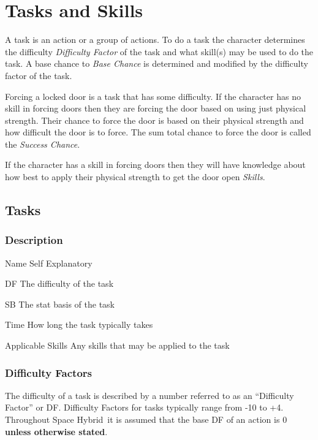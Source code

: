 \chapter{Tasks and Skills}

A task is an action or a group of actions. To do a task the 
character determines the difficulty {\em Difficulty Factor} of the 
task and what skill(s) may be used to do the task. A base chance to 
{\em Base Chance} is determined and modified by the difficulty factor 
of the task. 

Forcing a locked door is a task that has some difficulty. If the 
character has no skill in forcing doors then they are forcing the 
door based on using just physical strength. Their chance to force the 
door is based on their physical strength and how difficult the door 
is to force. The sum total chance to force the door is called the 
{\em Success Chance}.

If the character has a skill in forcing doors then they will have 
knowledge about how best to apply their physical strength to get the 
door open {\em Skills}. 

\section{Tasks}

\subsection{Description}

\begin{relate}
	\item[Name] 
	Self Explanatory
	\item[DF] The difficulty of the task
	\item[SB] The stat basis of the task
	\item[Time]
    How long the task typically takes
    \item[Applicable Skills]
    Any skills that may be applied to the task
\end{relate}

\subsection{Difficulty Factors}

The difficulty of a task is described by a number 
referred to as an ``Difficulty Factor'' or DF. Difficulty Factors 
for tasks typically range from -10  to +4. Throughout Space Hybrid\ it is 
assumed that the base DF of an action is 0 {\bf unless otherwise 
stated}. 

